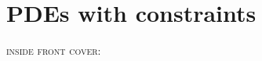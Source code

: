 \documentclass{tufte-book}
\newcommand{\CODELOC}{}  %
\newcommand{\stubinput}[2]{}
\newcommand{\stubinput}[2]{\vspace{5cm} \centerline{\LARGE Percent completed:  \Huge #2\%.} \vfill}
\theoremstyle{definition}
\begin{document}
\chapter{PDEs with constraints}
\label{chap:co}
\renewcommand{\CODELOC}{ch11/}
\stubinput{constrained.tex}{20}


\backmatter




\clearpage

\newcommand{\tblockeqncode}[3]{
\begin{tabular}[t]{l} #1: \\ \qquad {\small #2} \\ \quad {\large \underline{\texttt{#3}}} \end{tabular}
}
\newcommand{\tblockcode}[2]{
\begin{tabular}[t]{l} #1 \\ \quad {\large \underline{\texttt{#2}}} \end{tabular}
}
\newcommand{\tblock}[1]{
\begin{tabular}[t]{l} #1 \end{tabular}
}

\thispagestyle{empty}
\noindent \textsc{inside front cover:}
\end{document}
